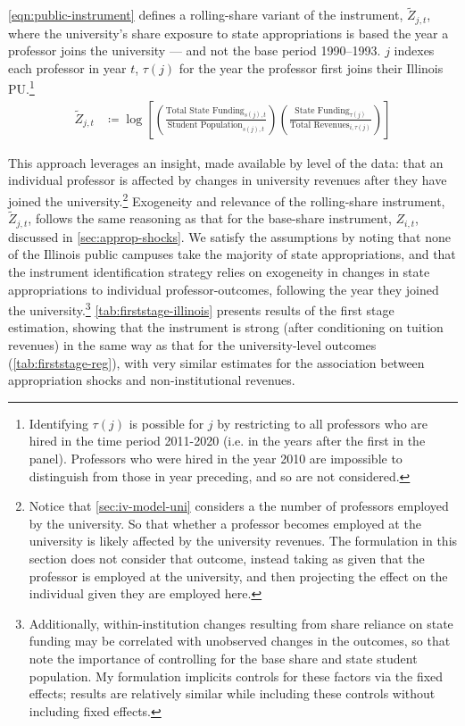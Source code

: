 \documentclass[notitlepage,12pt]{article}
\renewcommand{\tilde}[1]{\widetilde{#1}}                                   %
\begin{document}
\autoref{eqn:public-instrument} defines a rolling-share variant of the instrument, $\tilde Z_{j,t}$, where the university's share exposure to state appropriations is based the year a professor joins the university --- and not the base period 1990--1993.
$j$ indexes each professor in year $t$, $\tau(j)$ for the year the professor first joins their Illinois PU.\footnote{
    Identifying $\tau(j)$ is possible for $j$ by restricting to all professors who are hired in the time period 2011-2020 (i.e. in the years after the first in the panel).
    Professors who were hired in the year 2010 are impossible to distinguish from those in year preceding, and so are not considered.
}
\begin{align}
    \label{eqn:rolling-instrument}
    \tilde Z_{j,t} &\coloneqq \log \left[
    \left( \frac{\text{Total State Funding}_{s(j),t}}{\text{Student Population}_{s(j),t}} \right)
    \left( \frac{\text{State Funding}_{\tau(j)}}{\text{Total Revenues}_{i,\tau(j)}} \right) \right]
\end{align}

This approach leverages an insight, made available by level of the data: that an individual professor is affected by changes in university revenues after they have joined the university.\footnote{
    Notice that \autoref{sec:iv-model-uni} considers a the number of professors employed by the university.
    So that whether a professor becomes employed at the university is likely affected by the university revenues.
    The formulation in this section does not consider that outcome, instead taking as given that the professor is employed at the university, and then projecting the effect on the individual given they are employed here.
}
Exogeneity and relevance of the rolling-share instrument, $\tilde Z_{j,t}$, follows the same reasoning as that for the base-share instrument, $Z_{i,t}$, discussed in \autoref{sec:approp-shocks}.
We satisfy the assumptions by noting that none of the Illinois public campuses take the majority of state appropriations, and that the instrument identification strategy relies on exogeneity in changes in state appropriations to individual professor-outcomes, following the year they joined the university.\footnote{
    Additionally, within-institution changes resulting from share reliance on state funding may be correlated with unobserved changes in the outcomes, so that \cite{NBERw27885} note the importance of controlling for the base share and state student population.
    My formulation implicits controls for these factors via the fixed effects; results are relatively similar while including these controls without including fixed effects.
}
\autoref{tab:firststage-illinois} presents results of the first stage estimation, showing that the instrument is strong (after conditioning on tuition revenues) in the same way as that for the university-level outcomes (\autoref{tab:firststage-reg}), with very similar estimates for the association between appropriation shocks and non-institutional revenues.
\end{document}
